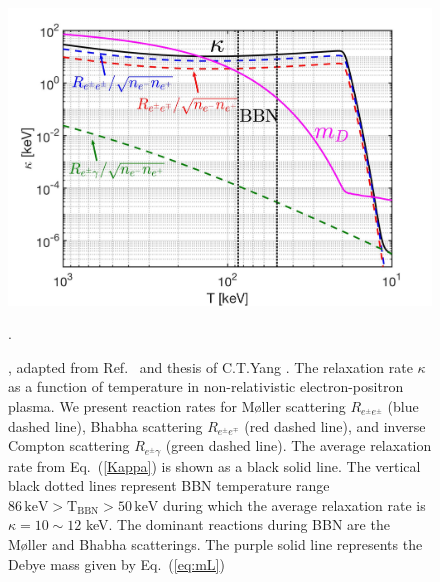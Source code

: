\begin{figure}[h!]
\begin{center}
\includegraphics[width=0.95\linewidth]{plots/chap03BBN/May152023Kappa_EPPlasma002}
\caption{, adapted from Ref.~\cite{Grayson:2023flr} and thesis of C.T.Yang \cite{Yang:2024ret}. The relaxation rate $\kappa$ as a function of temperature in non-relativistic electron-positron plasma. We present reaction rates for M{\o}ller scattering $R_{e^\pm e^\pm}$ (blue dashed line), Bhabha scattering $R_{e^\pm e^\mp}$ (red dashed line), and inverse Compton scattering $R_{e^\pm \gamma}$ (green dashed line). The average relaxation rate from Eq.~(\ref{Kappa}) is shown as a black solid line. The vertical black dotted lines represent BBN temperature range $86\,\mathrm{keV}>\mathrm{T_{BBN}}>50\,\mathrm{keV}$ during which the average relaxation rate is $\kappa=10\sim12$ keV. The dominant reactions during BBN are the M{\o}ller and Bhabha scatterings. The purple solid line represents the Debye mass given by Eq.~(\ref{eq:mL})}.
\label{RelaxationRate_fig}
\end{center}
\end{figure}
